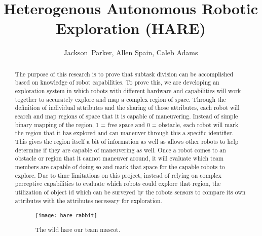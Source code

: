 \documentclass[conference]{IEEEtran}
\begin{document}
\title{Heterogenous Autonomous Robotic Exploration (HARE)}

\author{Jackson~Parker, Allen Spain, Caleb Adams}












\maketitle
\thispagestyle{plain}
\pagestyle{plain}

\begin{abstract}
  The purpose of this research is to prove that subtask division can be accomplished based on knowledge of robot capabilities. To prove this, we are developing an exploration system in which robots with different hardware and capabilities will work together to accurately explore and map a complex region of space. Through the definition of individual attributes and the sharing of those attributes, each robot will search and map regions of space that it is capable of maneuvering. Instead of simple binary mapping of the region, 1 = free space and 0 = obstacle, each robot will mark the region that it has explored and can maneuver through this a specific identifier. This gives the region itself a bit of information as well as allows other robots to help determine if they are capable of maneuvering as well.
  Once a robot comes to an obstacle or region that it cannot maneuver around, it will evaluate which team members are capable of doing so and mark that space for the capable robots to explore. Due to time limitations on this project, instead of relying on complex perceptive capabilities to evaluate which robots could explore that region, the utilization of object id which can be surveyed by the robots sensors to compare its own attributes with the attributes necessary for exploration.

  \begin{figure}[H]
    \centering
      \texttt{[image: hare-rabbit]}
    \caption{The wild hare our team mascot.}
    \label{fig:hare-rabbit}
  \end{figure}

\end{abstract}
\end{document}
